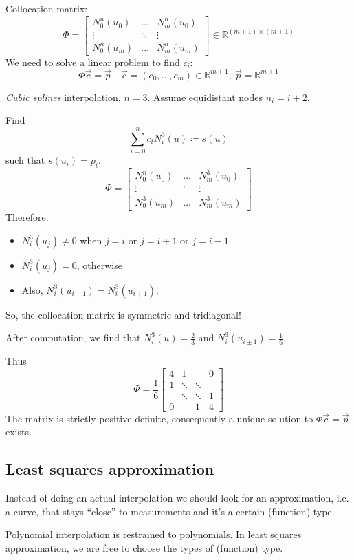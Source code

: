 Collocation matrix:
\[
    \Phi = \begin{bmatrix}
        N_0^n(u_0) & \dots & N_m^n(u_0)\\
        \vdots & \ddots & \vdots\\
        N_0^n(u_m) & \dots & N_m^n(u_m)
    \end{bmatrix}
    \in \mathbb{R}^{(m + 1) \times (m + 1)}
\]
We need to solve a linear problem to find $c_i$:
\[
    \Phi \vec{c} = \vec{p} \quad \vec{c} = (c_0, \dots, c_m) \in \mathbb{R}^{m+1},\
    \vec{p} = \mathbb{R}^{m+1}
\]
\begin{example}
    \textit{Cubic splines} interpolation, $n = 3$.
    Assume equidistant nodes $n_i = i + 2$.

    Find
    \[
        \sum_{i=0}^n c_i N_i^3(u) \coloneqq s(u)
    \]
    such that $s(u_i) = p_i$.
    \[
        \Phi = \begin{bmatrix}
            N_0^n(u_0) & \dots & N_m^3(u_0)\\
            \vdots & \ddots & \vdots\\
            N_0^3(u_m) & \dots & N_m^3(u_m)
        \end{bmatrix}
    \]
    Therefore:
    \begin{itemize}
        \item {
            $N_i^3(u_j) \ne 0$ when $j = i$ or $j = i + 1$ or $j = i - 1$.
        }
        \item {
            $N_i^3(u_j) = 0$, otherwise
        }
        \item {
            Also, $N_i^3(u_{i-1}) = N_i^3(u_{i+1})$.
        }
    \end{itemize}
    So, the collocation matrix is symmetric and tridiagonal!

    After computation, we find that
    $N_i^3(u) = \frac{2}{3}$ and $N_i^3(u_{i \pm 1}) = \frac{1}{6}$.

    Thus
    \[
        \Phi = \frac{1}{6}
        \begin{bmatrix}
            4 & 1 & & 0\\
            1 & \ddots & \ddots &\\
            & \ddots & \ddots & 1\\
            0 & & 1 & 4
        \end{bmatrix}
    \]
    The matrix is strictly positive definite, consequently a unique solution 
    to $\Phi \vec{c} = \vec{p}$ exists.
\end{example}

\subsection{Least squares approximation}
Instead of doing an actual interpolation
we should look for an approximation, i.e. a curve, 
that stays ``close'' to measurements and it's a certain (function) type.

Polynomial interpolation is restrained to polynomials. In least squares
approximation, we are free to choose the types of (function) type.
